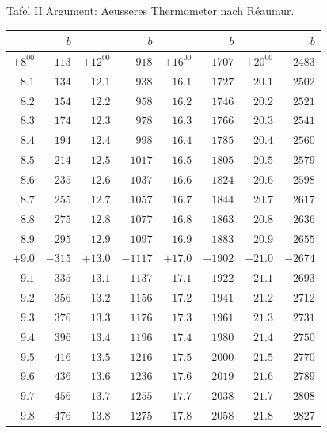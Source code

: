 \clearpage
\thispagestyle{empty}
\noindent{}%
\makebox[12mm][l]{}%
\makebox[\dimexpr\linewidth-24mm\relax]{}%
\par\nobreak\smallskip
\begin{GaussVIRefractionPlate}{Tafel II.\quad Argument: Aeusseres Thermometer nach Réaumur.}
{\fontsize{9}{10.2}\selectfont\setlength{\tabcolsep}{6pt}
\begin{tabular}{r|r||r|r||r|r||r|r}
&$b$&&$b$&&$b$&&$b$\\\hline
$+8^00$ & $-113$ & $+12^00$ & $-918$ & $+16^00$ & $-1707$ & $+20^00$ & $-2483$\\
$8.1$ & $134$ & $12.1$ & $938$ & $16.1$ & $1727$ & $20.1$ & $2502$\\
$8.2$ & $154$ & $12.2$ & $958$ & $16.2$ & $1746$ & $20.2$ & $2521$\\
$8.3$ & $174$ & $12.3$ & $978$ & $16.3$ & $1766$ & $20.3$ & $2541$\\
$8.4$ & $194$ & $12.4$ & $998$ & $16.4$ & $1785$ & $20.4$ & $2560$\\
$8.5$ & $214$ & $12.5$ & $1017$ & $16.5$ & $1805$ & $20.5$ & $2579$\\
$8.6$ & $235$ & $12.6$ & $1037$ & $16.6$ & $1824$ & $20.6$ & $2598$\\
$8.7$ & $255$ & $12.7$ & $1057$ & $16.7$ & $1844$ & $20.7$ & $2617$\\
$8.8$ & $275$ & $12.8$ & $1077$ & $16.8$ & $1863$ & $20.8$ & $2636$\\
$8.9$ & $295$ & $12.9$ & $1097$ & $16.9$ & $1883$ & $20.9$ & $2655$\\[4pt]
$+9.0$ & $-315$ & $+13.0$ & $-1117$ & $+17.0$ & $-1902$ & $+21.0$ & $-2674$\\
$9.1$ & $335$ & $13.1$ & $1137$ & $17.1$ & $1922$ & $21.1$ & $2693$\\
$9.2$ & $356$ & $13.2$ & $1156$ & $17.2$ & $1941$ & $21.2$ & $2712$\\
$9.3$ & $376$ & $13.3$ & $1176$ & $17.3$ & $1961$ & $21.3$ & $2731$\\
$9.4$ & $396$ & $13.4$ & $1196$ & $17.4$ & $1980$ & $21.4$ & $2750$\\
$9.5$ & $416$ & $13.5$ & $1216$ & $17.5$ & $2000$ & $21.5$ & $2770$\\
$9.6$ & $436$ & $13.6$ & $1236$ & $17.6$ & $2019$ & $21.6$ & $2789$\\
$9.7$ & $456$ & $13.7$ & $1255$ & $17.7$ & $2038$ & $21.7$ & $2808$\\
$9.8$ & $476$ & $13.8$ & $1275$ & $17.8$ & $2058$ & $21.8$ & $2827$\\

\end{tabular}}
\end{GaussVIRefractionPlate}
